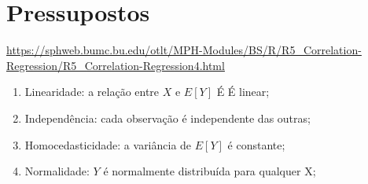 \documentclass{assignment}
\begin{document}
\section*{Pressupostos}

\url{https://sphweb.bumc.bu.edu/otlt/MPH-Modules/BS/R/R5_Correlation-Regression/R5_Correlation-Regression4.html}

\begin{enumerate}
  \item Linearidade: a relação entre $X$ e $E[Y]$ É É linear;
  \item Independência: cada observação é independente das outras;
  \item Homocedasticidade: a variância de $E[Y]$ é constante;
  \item Normalidade: $Y$ é normalmente distribuída para qualquer X;
\end{enumerate}
\end{document}
